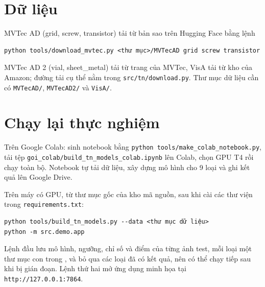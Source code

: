 \section*{Dữ liệu}

MVTec AD (grid, screw, transistor) tải từ bản sao trên Hugging Face bằng lệnh
\begin{verbatim}
python tools/download_mvtec.py <thư mục>/MVTecAD grid screw transistor
\end{verbatim}
MVTec AD 2 (vial, sheet\_metal) tải từ trang
của MVTec, VisA tải từ kho của Amazon; đường tải cụ thể nằm trong \texttt{src/tn/download.py}. Thư mục dữ liệu cần có
\texttt{MVTecAD/}, \texttt{MVTecAD2/} và \texttt{VisA/}.

\section*{Chạy lại thực nghiệm}

Trên Google Colab: sinh notebook bằng \texttt{python tools/make\_colab\_notebook.py}, tải tệp
\texttt{goi\_colab/build\_tn\_models\_colab.ipynb} lên Colab, chọn GPU T4 rồi chạy toàn bộ. Notebook tự tải dữ liệu,
xây dựng mô hình cho 9 loại và ghi kết quả lên Google Drive.

Trên máy có GPU, từ thư mục gốc của kho mã nguồn, sau khi cài các thư viện trong \texttt{requirements.txt}:
\begin{verbatim}
python tools/build_tn_models.py --data <thư mục dữ liệu>
python -m src.demo.app
\end{verbatim}
Lệnh đầu lưu mô hình, ngưỡng, chỉ số và điểm của từng ảnh test, mỗi loại một thư mục con trong
, và bỏ qua
các loại đã có kết quả, nên có thể chạy tiếp sau khi bị gián đoạn. Lệnh thứ hai mở ứng dụng minh họa tại
\texttt{http://127.0.0.1:7864}.
